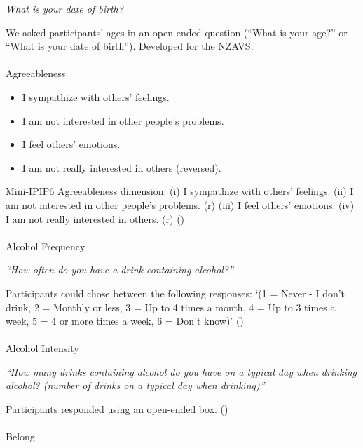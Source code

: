 \documentclass[
  single column]{article}
\makeatletter
\let\oldparagraph\paragraph
\renewcommand{\paragraph}{
    \@ifstar
      \xxxParagraphStar
      \xxxParagraphNoStar
  }
\newcommand{\xxxParagraphStar}[1]{\oldparagraph*{#1}\mbox{}}
\newcommand{\xxxParagraphNoStar}[1]{\oldparagraph{#1}\mbox{}}
\providecommand{\tightlist}{%
  \setlength{\itemsep}{0pt}\setlength{\parskip}{0pt}}\usepackage{longtable,booktabs,array}
\makeatother
\begin{document}
\emph{What is your date of birth?}

We asked participants' ages in an open-ended question (``What is your
age?'' or ``What is your date of birth''). Developed for the NZAVS.

\paragraph{Agreeableness}\label{agreeableness}

\begin{itemize}
\tightlist
\item
  I sympathize with others' feelings.
\item
  I am not interested in other people's problems.
\item
  I feel others' emotions.
\item
  I am not really interested in others (reversed).
\end{itemize}

Mini-IPIP6 Agreeableness dimension: (i) I sympathize with others'
feelings. (ii) I am not interested in other people's problems. (r) (iii)
I feel others' emotions. (iv) I am not really interested in others. (r)
()

\paragraph{Alcohol Frequency}\label{alcohol-frequency}

\emph{``How often do you have a drink containing alcohol?''}

Participants could chose between the following responses: `(1 = Never -
I don't drink, 2 = Monthly or less, 3 = Up to 4 times a month, 4 = Up to
3 times a week, 5 = 4 or more times a week, 6 = Don't know)'
()

\paragraph{Alcohol Intensity}\label{alcohol-intensity}

\emph{``How many drinks containing alcohol do you have on a typical day
when drinking alcohol? (number of drinks on a typical day when
drinking)''}

Participants responded using an open-ended box.
()

\paragraph{Belong}\label{belong}
\end{document}
